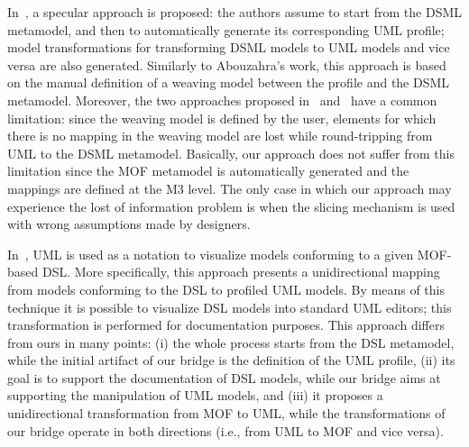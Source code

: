 In~\cite{Wimmer}, a specular approach is proposed: the authors assume to start from the DSML metamodel, and then to automatically
generate its corresponding UML profile; model transformations for transforming DSML models to UML models and vice versa are also generated. Similarly to Abouzahra's work, this approach is based on the manual definition of a weaving model between the profile and the DSML metamodel.
Moreover, the two approaches proposed in~\cite{Abouzahra} and~\cite{Wimmer} have a common limitation: since the weaving model is defined by the user, elements for which there is no mapping in the weaving model are lost while round-tripping from UML to the DSML metamodel. Basically, our approach does not suffer from this limitation since the MOF metamodel is automatically generated and the mappings are defined at the M3 level. The only case in which our approach may experience the lost of information problem is when the slicing mechanism is used with wrong assumptions made by designers. 

In~\cite{Graaf}, UML is used as a notation to visualize models conforming to a given MOF-based DSL.
More specifically, this approach presents a unidirectional mapping from models conforming to the DSL to profiled UML models.
By means of this technique it is possible to visualize DSL models into standard UML editors;
this transformation is performed for documentation purposes.
This approach differs from ours in many points: (i) the whole process starts from the DSL metamodel, while the initial artifact of our bridge is the definition of the UML profile, (ii) its goal is to support the documentation of DSL models, while our bridge aims at supporting the manipulation of UML models, and (iii) it proposes a unidirectional transformation from MOF to UML, while the transformations of our bridge operate in both directions (i.e., from UML to MOF and vice versa).

